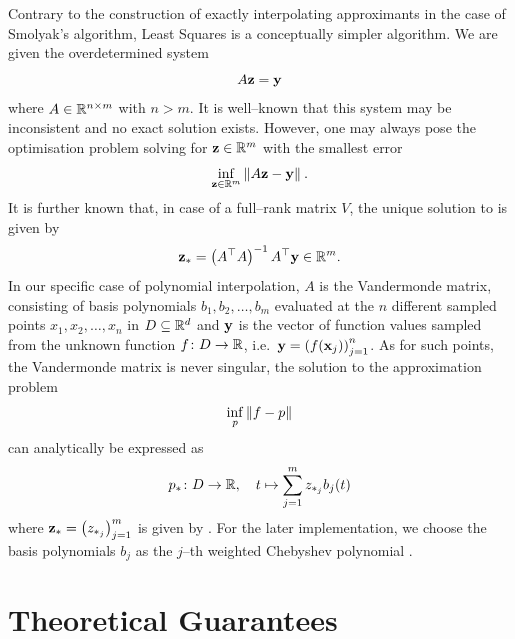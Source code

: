\documentclass[12pt, oneside]{amsart}
\theoremstyle{definition}
\theoremstyle{remark}
\numberwithin{equation}{section}
\begin{document}
Contrary to the construction of exactly interpolating approximants in the case 
of Smolyak's algorithm, Least Squares is a conceptually simpler algorithm. We 
are given the overdetermined system \[
A\bfz = \bfy
\]
where \(A \in \R^{n \times m}\) with \(n > m\). It is well--known that this 
system may be inconsistent and no exact solution exists. However, one may 
always pose the optimisation problem solving for \(\bfz \in \R^{m}\) with the 
smallest error
\begin{equation}\label{eq:leastSquares}
	\inf_{\bfz \in \R^{m}} \norm[]{A\bfz - \bfy}.
\end{equation}
It is further known that, in case of a full--rank matrix \(V\), the unique 
solution to  is given by 
\begin{equation}\label{eq:ls_solution_moore_penrose_inverse}
	\bfz_* = \left(A^\top A\right)^{-1} A^\top \bfy \in \R^m.
\end{equation}
In our specific case of polynomial interpolation, \(A\) is the Vandermonde 
matrix, consisting of basis polynomials \(b_1, b_2, \dots, b_m\) evaluated at 
the $n$ different sampled points \(x_1, x_2, \dots, x_n\) in \(D \subseteq 
\R^d\) and \(\bfy\) is the vector of function values sampled from the unknown 
function \(f\from D \to \R\), i.e.\ \(\bfy = \left(f(\bfx_j)\right)_{j=1}^n\). 
As for such points, the Vandermonde matrix is never singular, the solution to 
the approximation problem \[
\inf_{p} \norm[]{f-p}
\]
can analytically be expressed as \[
p_* \from D \to \R,\quad t \mapsto \sum_{j=1}^m z_{*_{j}} b_j(t)
\]
where \(\bfz_* = \left(z_{*_j}\right)_{j=1}^m\) is given by 
.
For the later implementation, we choose the basis polynomials \(b_j\) as the 
\(j\)--th weighted Chebyshev polynomial .

\section{Theoretical Guarantees}

\end{document}
